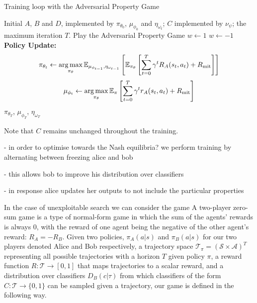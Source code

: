 \begin{algorithm}\label{alg:train}
\caption{Training loop with the Adversarial Property Game}
\begin{algorithmic}[1]
\Require  Initial $A$, $B$ and $D$, implemented by $\pi_{\theta_0}$, $\mu_{\phi_0}$ and $\eta_{\omega_t}$; $C$ implemented by $\nu_\psi$; the maximum iteration $T$.
    \State Play the Adversarial Property Game
        \State $w \gets 1$
    \Else
        \State $w \gets -1$
    \EndIf
    \State \textbf{Policy Update:}
    \begin{equation*}
        \pi_{\theta_t} \gets \operatorname*{arg\,max}_{\pi_\theta} \mathbb{E}_{\mu_{\phi_{t-1}}, \eta_{\omega_{t-1}}} \left[  \mathbb{E}_{\pi_\theta} \left[\sum^T_{t=0}\gamma^t R_A(s_t, a_t) + R_{\mathrm{mit}}\right] \right]
    \end{equation*}
    \begin{equation*}
        \mu_{\phi_t} \gets \operatorname*{arg\,max}_{\pi_\theta} \mathbb{E}_\pi \left[\sum^T_{t=0}\gamma^t r_A(s_t, a_t) + R_{\mathrm{mit}}\right]
    \end{equation*}
\EndFor
\Return $\pi_{\theta_T}$, $\mu_{\phi_T}$, $\eta_{\omega_T}$
\end{algorithmic}
\end{algorithm}
Note that $C$ remains unchanged throughout the training. %

- in order to optimise towards the Nash equilibria? we perform training by alternating between freezing alice and bob

- this allows bob to improve his distribution over classifiers

- in response alice updates her outputs to not include the particular properties

In the case of unexploitable search we can consider the game 
A two-player zero-sum game is a type of normal-form game in which the sum of the agents' rewards is always 0, with the reward of one agent being the negative of the other agent's reward: $R_A = -R_B$.
Given two policies, ${\pi}_\mathit{A}(a|s)$ and ${\pi}_\mathit{B}(a|s)$ for our two players denoted Alice and Bob respectively, a trajectory space $\mathcal{T}_{\pi} = (\mathcal{S} \times\mathcal{A})^T$ representing all possible trajectories with a horizon $T$ given policy $\pi$, a reward function $R:\mathcal{T}\to[0, 1]$ that maps trajectories to a scalar reward, and a distribution over classifiers $D_\mathit{B}(c|\tau)$ from which classifiers of the form $C: \mathcal{T} \to \{0, 1\}$ can be sampled given a trajectory, our game is defined in the following way.


